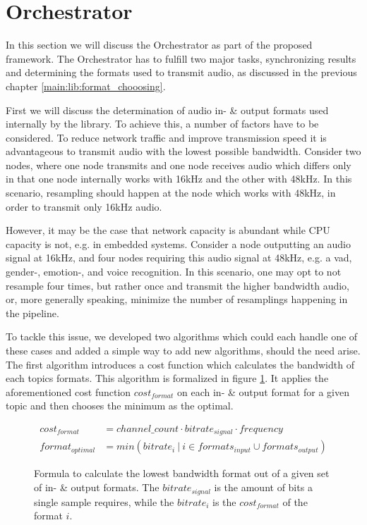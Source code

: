 


\section{Orchestrator}
\label{main:orc}
In this section we will discuss the Orchestrator as part of the proposed framework.
The Orchestrator has to fulfill two major tasks, synchronizing results and determining the formats used to transmit audio, as discussed in the previous chapter \ref{main:lib:format_chooosing}.

First we will discuss the determination of audio in- \& output formats used internally by the library.
To achieve this, a number of factors have to be considered.
To reduce network traffic and improve transmission speed it is advantageous to transmit audio with the lowest possible bandwidth.
Consider two nodes, where one node transmits and one node receives audio which differs only in that one node internally works with 16kHz and the other with 48kHz.
In this scenario, resampling should happen at the node which works with 48kHz, in order to transmit only 16kHz audio.

However, it may be the case that network capacity is abundant while CPU capacity is not, e.g. in embedded systems.
Consider a node outputting an audio signal at 16kHz, and four nodes requiring this audio signal at 48kHz, e.g. a \gls{vad}, gender-, emotion-, and voice recognition.
In this scenario, one may opt to not resample four times, but rather once and transmit the higher bandwidth audio, or, more generally speaking, minimize the number of resamplings happening in the pipeline.

To tackle this issue, we developed two algorithms which could each handle one of these cases and added a simple way to add new algorithms, should the need arise.
The first algorithm introduces a cost function which calculates the bandwidth of each topics formats.
This algorithm is formalized in figure \ref{main:orc:resampling:formula:min_traffic}.
It applies the aforementioned cost function $cost_{format}$ on each in- \& output format for a given topic and then chooses the minimum as the optimal.

\begin{figure}
	\begin{align}
	cost_{format} &= channel\_count \cdot bitrate_{signal} \cdot frequency\\
	format_{optimal} &= min({bitrate_{i}\ |\ i \in formats_{input} \cup formats_{output}})
	\end{align}
	\caption{Formula to calculate the lowest bandwidth format out of a given set of in- \& output formats.
		The $bitrate_{signal}$ is the amount of bits a single sample requires, while the $bitrate_{i}$ is the $cost_{format}$ of the format $i$.}
	\label{main:orc:resampling:formula:min_traffic}
\end{figure}

